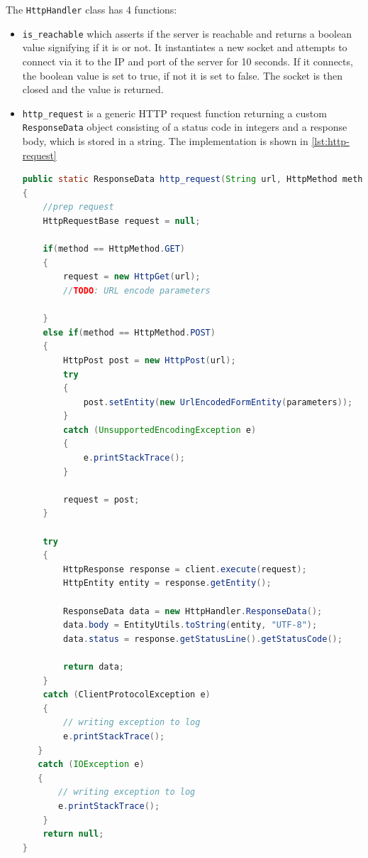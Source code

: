 The \texttt{HttpHandler} class has 4 functions: 
\begin{itemize}
\item  \texttt{is\_reachable} which asserts if the server is reachable and returns a boolean value signifying if it is or not. It instantiates a new socket and attempts to connect via it to the IP and port of the server for 10 seconds. If it connects, the boolean value is set to true, if not it is set to false. The socket is then closed and the value is returned.

\item \texttt{http\_request} is a generic \ac{HTTP} request function returning a custom \texttt{ResponseData} object consisting of a status code in integers and a response body, which is stored in a string. The implementation is shown in \autoref{lst:http-request}

\begin{lstlisting}[label={lst:http-request},caption={The http-request function},language=java]    
public static ResponseData http_request(String url, HttpMethod method, List<NameValuePair> parameters)
{
    //prep request
    HttpRequestBase request = null;

    if(method == HttpMethod.GET)
    {
        request = new HttpGet(url);
        //TODO: URL encode parameters

    }
    else if(method == HttpMethod.POST)
    {
        HttpPost post = new HttpPost(url);
        try
        {
            post.setEntity(new UrlEncodedFormEntity(parameters));
        }
        catch (UnsupportedEncodingException e)
        {
            e.printStackTrace();
        }

        request = post;
    }
    
    try
    {
        HttpResponse response = client.execute(request);
        HttpEntity entity = response.getEntity();

        ResponseData data = new HttpHandler.ResponseData();
        data.body = EntityUtils.toString(entity, "UTF-8");
        data.status = response.getStatusLine().getStatusCode();

        return data;
    }
    catch (ClientProtocolException e)
    {
        // writing exception to log
        e.printStackTrace();
   }
   catch (IOException e)
   {
       // writing exception to log
       e.printStackTrace();
    }
    return null;
}
\end{lstlisting} 


\end{itemize}
